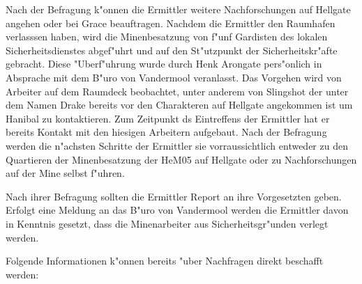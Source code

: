 
Nach der Befragung k"onnen die Ermittler weitere Nachforschungen auf Hellgate angehen oder bei Grace beauftragen. Nachdem die Ermittler den Raumhafen verlasssen haben, wird die Minenbesatzung von f"unf Gardisten des lokalen Sicherheitsdienstes abgef"uhrt und auf den St"utzpunkt der Sicherheitskr"afte gebracht. Diese "Uberf"uhrung wurde durch Henk Arongate pers"onlich in Absprache mit dem B"uro von Vandermool veranlasst. Das Vorgehen wird von Arbeiter auf dem Raumdeck beobachtet, unter anderem von Slingshot der unter dem Namen Drake bereits vor den Charakteren auf Hellgate angekommen ist um Hanibal zu kontaktieren. Zum Zeitpunkt ds Eintreffens der Ermittler hat er bereits Kontakt mit den hiesigen Arbeitern aufgebaut. Nach der Befragung werden die n"achsten Schritte der Ermittler sie vorraussichtlich entweder zu den Quartieren der Minenbesatzung der HeM05 auf Hellgate oder zu Nachforschungen auf der Mine selbst f"uhren. 

Nach ihrer Befragung sollten die Ermittler Report an ihre Vorgesetzten geben. Erfolgt eine Meldung an das B"uro von Vandermool werden die Ermittler davon in Kenntnis gesetzt, dass die Minenarbeiter aus Sicherheitsgr"unden verlegt werden.

Folgende Informationen k"onnen bereits "uber Nachfragen direkt beschafft werden:

